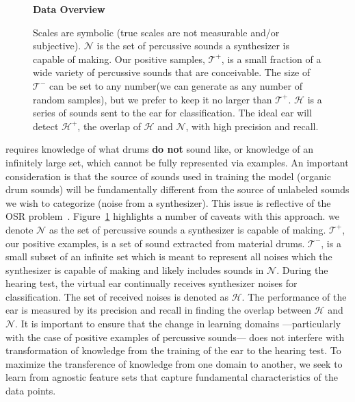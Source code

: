 \documentclass[runningheads,a4paper]{llncs}
\begin{document}
\begin{figure}[htbp!]
    \begin{center}
    \textbf{Data Overview}
    \end{center}
    \caption{ 
    Scales are symbolic (true scales are not measurable and/or subjective).  $\mathcal{N}$ is the set of percussive sounds a synthesizer is capable of making. Our positive samples, $\mathcal{T^{+}}$, is a small fraction of a wide variety of percussive sounds that are conceivable. The size of $\mathcal{T^{-}}$ can be set to any number(we can generate as any number of random samples), but we prefer to keep it no larger than  $\mathcal{T^{+}}$. $\mathcal{H}$ is a series of sounds sent to the ear for classification. The ideal ear will detect  $\mathcal{H^{+}}$, the overlap of $\mathcal{H}$ and $\mathcal{N}$, with high precision and recall. 
    }
\label{fig:ven_data}
\end{figure}
 requires knowledge of what drums \textbf{do not} sound like, or knowledge of an infinitely large set, which cannot be fully represented via examples. An important consideration is that the source of sounds used in training the model (organic drum sounds) will be fundamentally different from the source of unlabeled sounds we wish to categorize (noise from a synthesizer). This issue is reflective of the OSR problem~\cite{geng2020recent,mundt2019open}. Figure~\ref{fig:ven_data} highlights a number of caveats with this approach. we denote $\mathcal{N}$ as the set of percussive sounds a synthesizer is capable of making. $\mathcal{T^{+}}$, our positive examples, is a set of sound extracted from material drums. $\mathcal{T^{-}}$, is a small subset of an infinite set which is meant to represent all noises which the synthesizer is capable of making and likely includes sounds in $\mathcal{N}$. During the hearing test, the virtual ear continually receives synthesizer noises for classification. The set of received noises is denoted as $\mathcal{H}$. The performance of the ear is measured by its precision and recall in finding the overlap between $\mathcal{H}$ and $\mathcal{N}$. It is important to ensure that the change in learning domains ---particularly with the case of positive examples of percussive sounds--- does not interfere with transformation of knowledge from the training of the ear to the hearing test. To maximize the transference of knowledge from one domain to another, we seek to learn from agnostic feature sets that capture fundamental characteristics of the data points.
\end{document}

